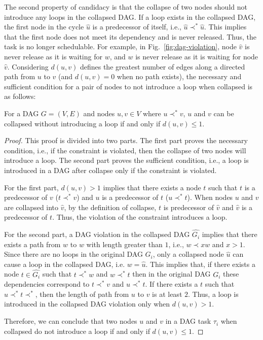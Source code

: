 The second property of candidacy is that the collapse of two nodes should not introduce any loops in the collapsed DAG.  If a loop exists in the collapsed DAG, the first node in the cycle $\hat{u}$ is a predecessor of itself, i.e., $\hat{u} \prec^{*} \hat{u}$. This implies that the first node does not meet its dependency and is never released. Thus, the task is no longer schedulable. For example, in Fig.~\ref{fig:dag-violation}, node $\hat{v}$ is never release as it is waiting for $w$, and $w$ is never release as it is waiting for node $\hat{v}$. Considering \textbf{${d(u, v)}$} defines the greatest number of edges along a directed path from $u$ to $v$ (and ${d(u,v) = 0}$ when no path exists), the necessary and sufficient condition for a pair of nodes to not introduce a loop when collapsed is as follows:


\begin{theorem}
  For a DAG ${G = (V, E)}$ and nodes ${u, v \in V}$ where ${u \prec^{*}
    v}$, ${u}$ and ${v}$ can be collapsed without introducing a loop
  if and  only if ${d(u, v) \le 1}$.
\end{theorem}
\begin{proof}
This proof is divided into two parts. The first part proves the necessary condition, i.e., if the constraint is violated, then the collapse of two nodes will introduce a loop. The second part proves the sufficient condition, i.e., a loop is introduced in a DAG after collapse only if the constraint is violated. 

For the first part, $d(u, v) > 1$ implies that there exists a node $t$ such that $t$ is a predecessor of $v$ ($t \prec^{*} v$) and $u$ is a predecessor of $t$ ($u \prec^{*} t$). When nodes $u$ and $v$ are collapsed into $\hat{v}$, by the definition of collapse, $t$ is predecessor of $\hat{v}$ and $\hat{v}$ is a predecessor of $t$. Thus, the violation of the constraint introduces a loop. 

For the second part, a DAG violation in the collapsed DAG $\hat{G_i}$ implies that there exists a path from $w$ to $w$ with length greater than $1$, i.e., $w \prec{x} w$ and $x > 1$.  Since there are no loops in the original DAG $G_i$, only a collapsed node $\hat{u}$ can cause a loop in the collapsed DAG, i.e. $w = \hat{u}$. This implies that, if there exists a node $t \in \hat{G_i}$ such that $t \prec^{*} w$ and $w \prec^{*} t$ then in the original DAG $G_i$ these dependencies correspond to $t \prec^{*} v$ and $u \prec^{*} t$. If there exists a $t$ such that $u \prec^{*} t \prec^{*}$, then the length of path from $u$ to $v$ is at least $2$. Thus, a loop is introduced in the collapsed DAG violation only when $d(u, v) > 1$. 

Therefore, we can conclude that two nodes $u$ and $v$ in a DAG task $\tau_i$ when collapsed do not introduce a loop if and only if $d(u, v) \le 1$.
\end{proof}

